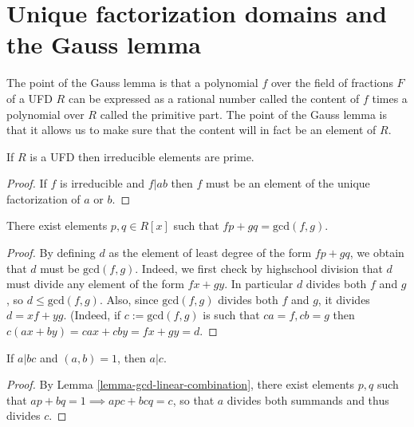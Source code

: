 \section{Unique factorization domains and the Gauss lemma}
\label{section-UFD}

The point of the Gauss lemma is that a polynomial $f$ over the field of fractions
$F$ of a UFD $R$ can be expressed as a rational number called the content of $f$
times a polynomial over $R$ called the primitive part. The point of the Gauss
lemma is that it allows us to make sure that the content will in fact be an
element of $R$.

\medskip\noindent

\begin{lemma}
\label{lemma-irreducible-is-prime}
If $R$ is a UFD then irreducible elements are prime.
\end{lemma}

\begin{proof}
If $f$ is irreducible and $f|ab$ then $f$ must be an element of the unique
factorization of $a$ or $b$.
\end{proof}

\begin{lemma}
\label{lemma-gcd-linear-combination}
There exist elements  $p,q \in R[x]$ such that $fp+gq=\text{gcd}(f,g)$.
\end{lemma}

\begin{proof}
By defining $d$ as the element of least degree of the form $fp+gq$, we obtain
that $d$ must be $\text{gcd}(f,g)$. Indeed, we first check by highschool
division that $d$ must divide any element of the form $fx+gy$. In particular
$d$ divides both $f$ and $g$, so $d \leq \text{gcd}(f,g)$. Also, since
$\text{gcd}(f,g)$ divides both $f$ and $g$, it divides $d=xf+yg$. (Indeed, if
$c:=\text{gcd}(f,g)$ is such that $ca=f,cb=g$ then $c(ax+by)=cax+cby=fx+gy=d$.
\end{proof}

\begin{lemma}
\label{lemma-relatively-prime-and-divides-implies-divides}
If $a|bc$ and $(a,b)=1$, then $a|c$.
\end{lemma}

\begin{proof}
By Lemma \ref{lemma-gcd-linear-combination}, there exist elements $p,q$ such
that $ap+bq=1\implies apc+bcq=c$, so that $a$ divides both summands and thus
divides $c$.
\end{proof}

